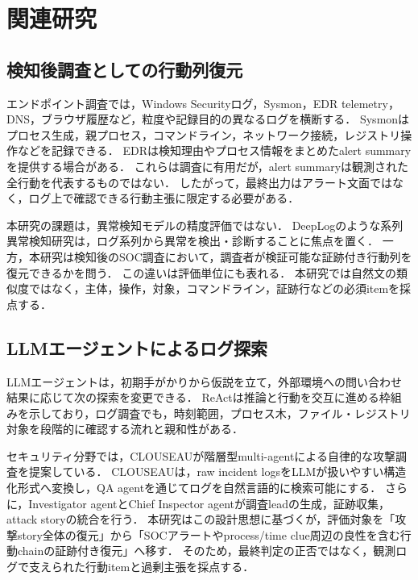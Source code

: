 

\section{関連研究}

\subsection{検知後調査としての行動列復元}

エンドポイント調査では，Windows Securityログ，Sysmon，EDR telemetry，DNS，ブラウザ履歴など，粒度や記録目的の異なるログを横断する．
Sysmonはプロセス生成，親プロセス，コマンドライン，ネットワーク接続，レジストリ操作などを記録できる\cite{sysmon}．
EDRは検知理由やプロセス情報をまとめたalert summaryを提供する場合がある．
これらは調査に有用だが，alert summaryは観測された全行動を代表するものではない．
したがって，最終出力はアラート文面ではなく，ログ上で確認できる行動主張に限定する必要がある．

本研究の課題は，異常検知モデルの精度評価ではない．
DeepLogのような系列異常検知研究は，ログ系列から異常を検出・診断することに焦点を置く\cite{deeplog}．
一方，本研究は検知後のSOC調査において，調査者が検証可能な証跡付き行動列を復元できるかを問う．
この違いは評価単位にも表れる．
本研究では自然文の類似度ではなく，主体，操作，対象，コマンドライン，証跡行などの必須itemを採点する．

\subsection{LLMエージェントによるログ探索}

LLMエージェントは，初期手がかりから仮説を立て，外部環境への問い合わせ結果に応じて次の探索を変更できる．
ReActは推論と行動を交互に進める枠組みを示しており\cite{react}，ログ調査でも，時刻範囲，プロセス木，ファイル・レジストリ対象を段階的に確認する流れと親和性がある．

セキュリティ分野では，CLOUSEAUが階層型multi-agentによる自律的な攻撃調査を提案している\cite{clouseau}．
CLOUSEAUは，raw incident logsをLLMが扱いやすい構造化形式へ変換し，QA agentを通じてログを自然言語的に検索可能にする．
さらに，Investigator agentとChief Inspector agentが調査leadの生成，証跡収集，attack storyの統合を行う．
本研究はこの設計思想に基づくが，評価対象を「攻撃story全体の復元」から「SOCアラートやprocess/time clue周辺の良性を含む行動chainの証跡付き復元」へ移す．
そのため，最終判定の正否ではなく，観測ログで支えられた行動itemと過剰主張を採点する．

